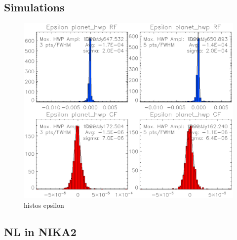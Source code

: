 \subsection{Simulations}

\begin{figure}
	\includegraphics[clip, angle=0, width=\columnwidth]{Figures/histos_epsilon.eps}
	\caption{histos epsilon}
	\label{fig:histos_epsilon}
\end{figure}

\subsection{NL in NIKA2}